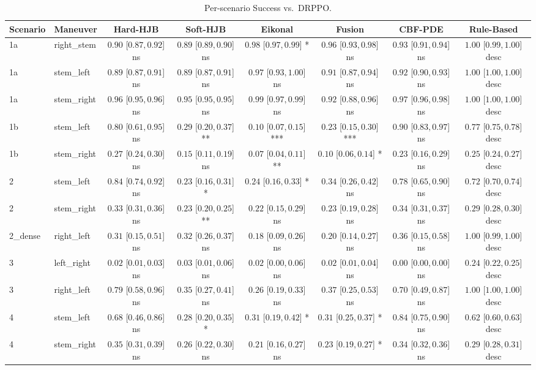 \begin{table}[ht]
\centering
\caption{Per-scenario Success vs.\ DRPPO.}
\label{tab:per_scenario_success_rate}
\begin{tabular}{llcccccc}
\toprule
Scenario & Maneuver & Hard-HJB & Soft-HJB & Eikonal & Fusion & CBF-PDE & Rule-Based \\
\midrule
1a & right_stem & $0.90$ [$0.87, 0.92$] ns & $0.89$ [$0.89, 0.90$] ns & $0.98$ [$0.97, 0.99$] * & $0.96$ [$0.93, 0.98$] ns & $0.93$ [$0.91, 0.94$] ns & $1.00$ [$0.99, 1.00$] desc \\
1a & stem_left & $0.89$ [$0.87, 0.91$] ns & $0.89$ [$0.87, 0.91$] ns & $0.97$ [$0.93, 1.00$] ns & $0.91$ [$0.87, 0.94$] ns & $0.92$ [$0.90, 0.93$] ns & $1.00$ [$1.00, 1.00$] desc \\
1a & stem_right & $0.96$ [$0.95, 0.96$] ns & $0.95$ [$0.95, 0.95$] ns & $0.99$ [$0.97, 0.99$] ns & $0.92$ [$0.88, 0.96$] ns & $0.97$ [$0.96, 0.98$] ns & $1.00$ [$1.00, 1.00$] desc \\
1b & stem_left & $0.80$ [$0.61, 0.95$] ns & $0.29$ [$0.20, 0.37$] ** & $0.10$ [$0.07, 0.15$] *** & $0.23$ [$0.15, 0.30$] *** & $0.90$ [$0.83, 0.97$] ns & $0.77$ [$0.75, 0.78$] desc \\
1b & stem_right & $0.27$ [$0.24, 0.30$] ns & $0.15$ [$0.11, 0.19$] ns & $0.07$ [$0.04, 0.11$] ** & $0.10$ [$0.06, 0.14$] * & $0.23$ [$0.16, 0.29$] ns & $0.25$ [$0.24, 0.27$] desc \\
2 & stem_left & $0.84$ [$0.74, 0.92$] ns & $0.23$ [$0.16, 0.31$] * & $0.24$ [$0.16, 0.33$] * & $0.34$ [$0.26, 0.42$] ns & $0.78$ [$0.65, 0.90$] ns & $0.72$ [$0.70, 0.74$] desc \\
2 & stem_right & $0.33$ [$0.31, 0.36$] ns & $0.23$ [$0.20, 0.25$] ** & $0.22$ [$0.15, 0.29$] ns & $0.23$ [$0.19, 0.28$] ns & $0.34$ [$0.31, 0.37$] ns & $0.29$ [$0.28, 0.30$] desc \\
2_dense & right_left & $0.31$ [$0.15, 0.51$] ns & $0.32$ [$0.26, 0.37$] ns & $0.18$ [$0.09, 0.26$] ns & $0.20$ [$0.14, 0.27$] ns & $0.36$ [$0.15, 0.58$] ns & $1.00$ [$0.99, 1.00$] desc \\
3 & left_right & $0.02$ [$0.01, 0.03$] ns & $0.03$ [$0.01, 0.06$] ns & $0.02$ [$0.00, 0.06$] ns & $0.02$ [$0.01, 0.04$] ns & $0.00$ [$0.00, 0.00$] ns & $0.24$ [$0.22, 0.25$] desc \\
3 & right_left & $0.79$ [$0.58, 0.96$] ns & $0.35$ [$0.27, 0.41$] ns & $0.26$ [$0.19, 0.33$] ns & $0.37$ [$0.25, 0.53$] ns & $0.70$ [$0.49, 0.87$] ns & $1.00$ [$1.00, 1.00$] desc \\
4 & stem_left & $0.68$ [$0.46, 0.86$] ns & $0.28$ [$0.20, 0.35$] * & $0.31$ [$0.19, 0.42$] * & $0.31$ [$0.25, 0.37$] * & $0.84$ [$0.75, 0.90$] ns & $0.62$ [$0.60, 0.63$] desc \\
4 & stem_right & $0.35$ [$0.31, 0.39$] ns & $0.26$ [$0.22, 0.30$] ns & $0.21$ [$0.16, 0.27$] ns & $0.23$ [$0.19, 0.27$] * & $0.34$ [$0.32, 0.36$] ns & $0.29$ [$0.28, 0.31$] desc \\
\bottomrule
\end{tabular}
\end{table}
